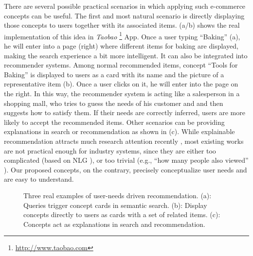 There are several possible practical scenarios in which 
applying such e-commerce concepts can be useful.
The first and most natural scenario is directly displaying those concepts to users 
together with its associated items.
(a/b) shows the real implementation of this idea in 
\textit{Taobao} \footnote{\url{http://www.taobao.com}} App.
Once a user typing ``Baking'' (a), 
he will enter into a page (right) where different items for baking are displayed, making the search experience a bit more intelligent.
It can also be integrated into recommender systems.
Among normal recommended items, 
concept ``Tools for Baking'' is displayed to users as a card with its name and the picture of a representative item (b).
Once a user clicks on it, he will enter into the page on the right.
In this way, the recommender system is acting like a salesperson in a shopping mall, 
who tries to guess the needs of his customer and and then suggests how to satisfy
them. 
If their needs are correctly inferred, users are more likely to accept 
the recommended items.
Other scenarios can be providing explanations in search or recommendation as 
shown in (c).
While explainable recommendation attracts much research attention 
recently \cite{zhang2018explainable}, 
most existing works are not practical enough for industry systems,
since they are either too complicated 
(based on NLG \cite{zanker2010knowledgeable,cleger2012explaining}), or too trivial 
(e.g., ``how many people also viewed'' \cite{costa2018automatic,li2017neural}).
Our proposed concepts, on the contrary, precisely conceptualize user needs and are
easy to understand.

 \begin{figure}[th]
	\centering
	\caption{Three real examples of user-needs driven recommendation.
		(a): Queries trigger concept cards in semantic search. (b): Display concepts directly to users as cards with a set of related items. (c): Concepts act as explanations in search and recommendation.
	}
	\label{fig:cloud}
\end{figure}

